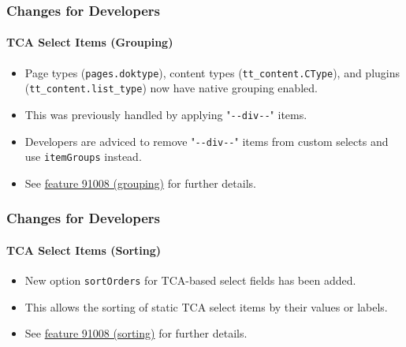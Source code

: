 
\begin{frame}[fragile]
	\frametitle{Changes for Developers}
	\framesubtitle{TCA Select Items (Grouping)}

	\begin{itemize}
		\item Page types (\texttt{pages.doktype}), content types (\texttt{tt\_content.CType}),
			and plugins (\texttt{tt\_content.list\_type}) now have native grouping enabled.
		\item This was previously handled by applying
			"\texttt{-}\texttt{-div-}\texttt{-}" items.
		\item Developers are adviced to remove
			"\texttt{-}\texttt{-div-}\texttt{-}" items
			from custom selects and use \texttt{itemGroups} instead.
		\item See
			\href{https://docs.typo3.org/c/typo3/cms-core/master/en-us/Changelog/10.4/Feature-91008-ItemGroupingForTCASelectItems.html}{feature 91008 (grouping)}
			for further details.
	\end{itemize}

\end{frame}


\begin{frame}[fragile]
	\frametitle{Changes for Developers}
	\framesubtitle{TCA Select Items (Sorting)}

	\begin{itemize}
		\item New option \texttt{sortOrders} for TCA-based select fields has been added.
		\item This allows the sorting of static TCA select items by their values or labels.
		\item See
			\href{https://docs.typo3.org/c/typo3/cms-core/master/en-us/Changelog/10.4/Feature-91008-ItemSortingForTCASelectItems.html}{feature 91008 (sorting)}
			for further details.
	\end{itemize}

\end{frame}


